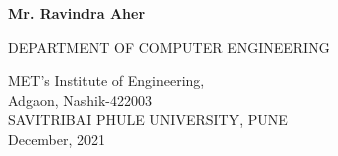 \documentclass[openany,12pt]{report}
\begin{document}
\begin{titlepage}
\begin{center}
			{\bf Mr. Ravindra Aher}\\
			\vspace{0.4in}
			
			
			{\small DEPARTMENT OF COMPUTER ENGINEERING}\\
			\begin{figure}[h]
				\centerline{}
				\label{atcres}
			\end{figure}
			{\large MET's Institute of Engineering,}\\
			{\small Adgaon, Nashik-422003}\\
			SAVITRIBAI PHULE UNIVERSITY, PUNE\\
			\vspace{0.2in}
			{\small December, 2021}
		\end{center}
	\end{titlepage}
	
\end{document}

